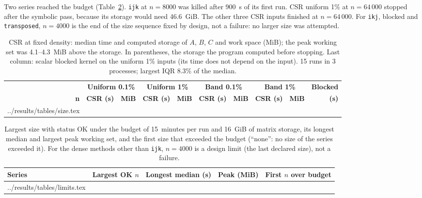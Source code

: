 \documentclass[11pt,a4paper]{article}
\makeatletter
\newcommand{\tableinput}[1]{\@@input #1 }
\makeatother
\begin{document}
Two series reached the budget (Table~\ref{tab:limits}). \texttt{ijk} at $n = 8000$ was killed
after 900~s of its first run. CSR uniform 1\% at $n = 64\,000$ stopped after the symbolic
pass, because its storage would need 46.6~GiB. The other three CSR inputs finished at
$n = 64\,000$. For \texttt{ikj}, blocked and \texttt{transposed}, $n = 4000$ is the end of the
size sequence fixed by design, not a failure: no larger size was attempted.

\begin{table}[H]
\centering
\footnotesize
\setlength{\tabcolsep}{3.5pt}
\begin{tabular}{rllllllllr}
\toprule
& \multicolumn{2}{c}{\textbf{Uniform 0.1\%}} & \multicolumn{2}{c}{\textbf{Uniform 1\%}} &
\multicolumn{2}{c}{\textbf{Band 0.1\%}} & \multicolumn{2}{c}{\textbf{Band 1\%}} &
\textbf{Blocked} \\
\cmidrule(lr){2-3} \cmidrule(lr){4-5} \cmidrule(lr){6-7} \cmidrule(lr){8-9}
\textbf{n} & \textbf{CSR (s)} & \textbf{MiB} & \textbf{CSR (s)} & \textbf{MiB} &
\textbf{CSR (s)} & \textbf{MiB} & \textbf{CSR (s)} & \textbf{MiB} & \textbf{(s)} \\
\midrule
\tableinput{../results/tables/size.tex}
\bottomrule
\end{tabular}
\caption{CSR at fixed density: median time and computed storage of $A$, $B$, $C$ and work
space (MiB); the peak working set was 4.1--4.3~MiB above the storage. In parentheses, the
storage the program computed before stopping. Last column: scalar blocked kernel on the
uniform 1\% inputs (its time does not depend on the input). 15 runs in 3 processes; largest
IQR 8.3\% of the median.}
\label{tab:size}
\end{table}

\begin{table}[H]
\centering
\footnotesize
\setlength{\tabcolsep}{4pt}
\begin{tabular}{lrlrl}
\toprule
\textbf{Series} & \textbf{Largest OK $n$} & \textbf{Longest median (s)} &
\textbf{Peak (MiB)} & \textbf{First $n$ over budget} \\
\midrule
\tableinput{../results/tables/limits.tex}
\bottomrule
\end{tabular}
\caption{Largest size with status OK under the budget of 15~minutes per run and 16~GiB of
matrix storage, its longest median and largest peak working set, and the first size that
exceeded the budget (``none'': no size of the series exceeded it). For the dense methods
other than \texttt{ijk}, $n = 4000$ is a design limit (the last declared size), not a failure.}
\label{tab:limits}
\end{table}
\end{document}
